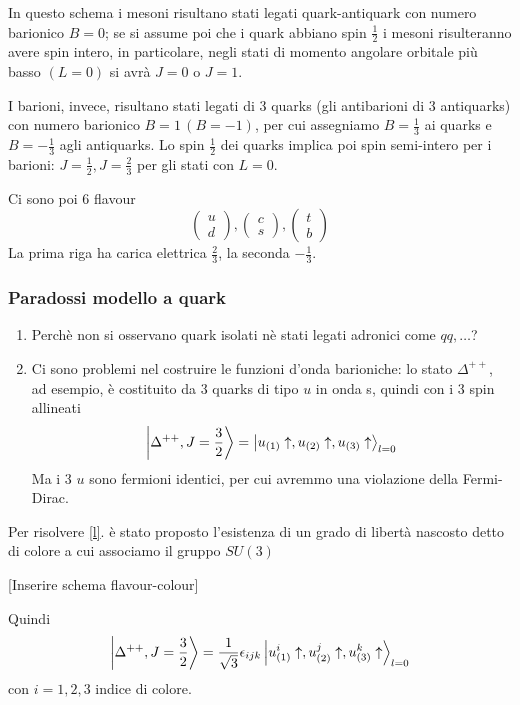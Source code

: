 \documentclass[10pt,a4paper]{article}
\theoremstyle{definition}
\begin{document}
In questo schema i mesoni risultano stati legati quark-antiquark con numero barionico \(B = 0\); se si assume poi che i quark abbiano spin \(\frac12\) i mesoni risulteranno avere spin intero, in particolare, negli stati di momento angolare orbitale più basso \((L = 0)\) si avrà \(J = 0\) o \(J = 1\).

I barioni, invece, risultano stati legati di 3 quarks (gli antibarioni di 3 antiquarks) con numero barionico \(B = 1\, (B = -1)\), per cui assegniamo \(B = \frac13\) ai quarks e \(B = -\frac13\) agli antiquarks. Lo spin \(\frac12\) dei quarks implica poi spin semi-intero per i barioni: \(J = \frac12, J = \frac23\) per gli stati con \(L = 0\).

Ci sono poi 6 flavour
\[
\begin{pmatrix}
u \\ d    
\end{pmatrix}
,
\begin{pmatrix}
    c \\ s
\end{pmatrix}
,
\begin{pmatrix}
    t \\ b 
\end{pmatrix}
\]
La prima riga ha carica elettrica \(\frac23\), la seconda \(-\frac13\).

\subsubsection{Paradossi modello a quark}
\begin{enumerate}
    \item Perchè non si osservano quark isolati nè stati legati adronici come $qq, \dots$? \label{conf}
    \item Ci sono problemi nel costruire le funzioni d'onda barioniche: lo stato \(\Delta^{++}\), ad esempio, è costituito da 3 quarks di tipo \(u\) in onda s, quindi con i 3 spin allineati
    \[
    \ket{\Delta^{++}, J = \frac32} = \ket{u_{(1)}\uparrow, u_{(2)}\uparrow, u_{(3)}\uparrow}_{l = 0} 
    \] 
    Ma i 3 \(u\) sono fermioni identici, per cui avremmo una violazione della Fermi-Dirac. \label{l}
\end{enumerate}
Per risolvere \ref*{l}. è stato proposto l'esistenza di un grado di libertà nascosto detto di colore a cui associamo il gruppo $SU(3)$

[Inserire schema flavour-colour]

Quindi 
\[
    \ket{\Delta^{++}, J = \frac32} = \frac{1}{\sqrt{3}}\epsilon_{ijk} \ket{u_{(1)}^i\uparrow, u_{(2)}^j\uparrow, u_{(3)}^k\uparrow}_{l = 0} 
\] 
con \(i = 1, 2, 3\) indice di colore.
\end{document}
